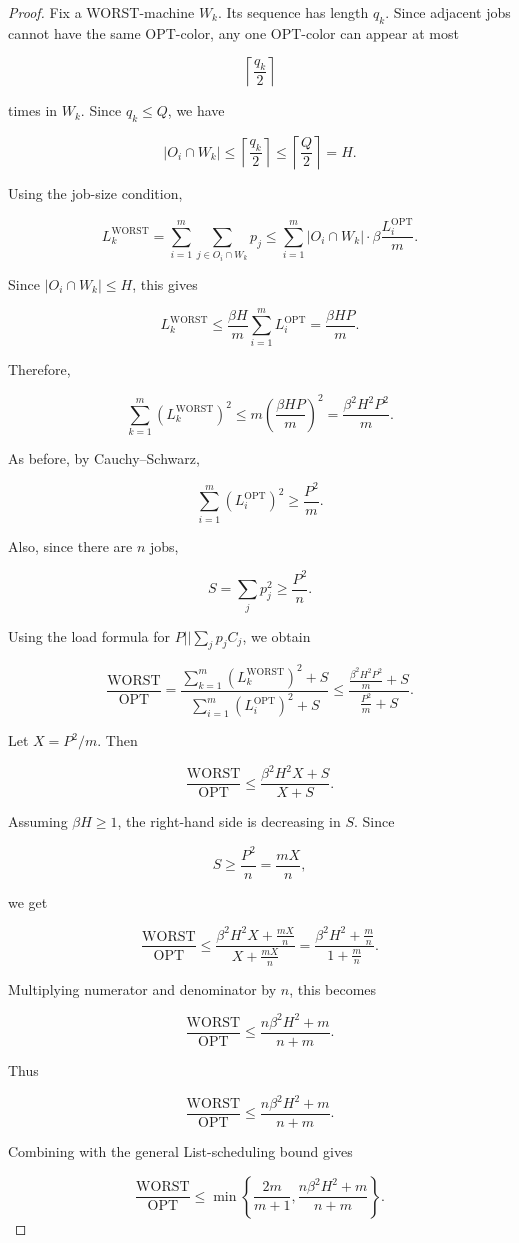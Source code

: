 \documentclass[11pt]{article}
\newcommand{\OPT}{\mathrm{OPT}}
\newcommand{\WORST}{\mathrm{WORST}}
\begin{document}
\begin{proof}
Fix a WORST-machine \(W_k\). Its sequence has length \(q_k\). Since adjacent jobs cannot
have the same OPT-color, any one OPT-color can appear at most

\[
\left\lceil \frac{q_k}{2}\right\rceil
\]

times in \(W_k\). Since \(q_k\le Q\), we have

\[
|O_i\cap W_k|
\le
\left\lceil \frac{q_k}{2}\right\rceil
\le
\left\lceil \frac Q2\right\rceil
=
H.
\]

Using the job-size condition,

\[
L_k^{\WORST}
=
\sum_{i=1}^m \sum_{j\in O_i\cap W_k} p_j
\le
\sum_{i=1}^m |O_i\cap W_k| \cdot \beta \frac{L_i^{\OPT}}{m}.
\]

Since \(|O_i\cap W_k|\le H\), this gives

\[
L_k^{\WORST}
\le
\frac{\beta H}{m}\sum_{i=1}^m L_i^{\OPT}
=
\frac{\beta HP}{m}.
\]

Therefore,

\[
\sum_{k=1}^m \left(L_k^{\WORST}\right)^2
\le
m\left(\frac{\beta HP}{m}\right)^2
=
\frac{\beta^2H^2P^2}{m}.
\]

As before, by Cauchy--Schwarz,

\[
\sum_{i=1}^m \left(L_i^{\OPT}\right)^2
\ge
\frac{P^2}{m}.
\]

Also, since there are \(n\) jobs,

\[
S=\sum_j p_j^2
\ge
\frac{P^2}{n}.
\]

Using the load formula for \(P||\sum_j p_j C_j\), we obtain

\[
\frac{\WORST}{\OPT}
=
\frac{
\sum_{k=1}^m (L_k^{\WORST})^2+S
}{
\sum_{i=1}^m (L_i^{\OPT})^2+S
}
\le
\frac{
\frac{\beta^2H^2P^2}{m}+S
}{
\frac{P^2}{m}+S
}.
\]

Let \(X=P^2/m\). Then

\[
\frac{\WORST}{\OPT}
\le
\frac{\beta^2H^2X+S}{X+S}.
\]

Assuming \(\beta H\ge 1\), the right-hand side is decreasing in \(S\). Since

\[
S\ge \frac{P^2}{n}=\frac{mX}{n},
\]

we get

\[
\frac{\WORST}{\OPT}
\le
\frac{\beta^2H^2X+\frac{mX}{n}}{X+\frac{mX}{n}}
=
\frac{\beta^2H^2+\frac mn}{1+\frac mn}.
\]

Multiplying numerator and denominator by \(n\), this becomes

\[
\frac{\WORST}{\OPT}
\le
\frac{n\beta^2H^2+m}{n+m}.
\]

Thus

\[
\frac{\WORST}{\OPT}
\le
\frac{n\beta^2H^2+m}{n+m}.
\]

Combining with the general List-scheduling bound gives

\[
\frac{\WORST}{\OPT}
\le
\min\left\{
\frac{2m}{m+1},
\frac{n\beta^2H^2+m}{n+m}
\right\}.
\]
\end{proof}
\end{document}
